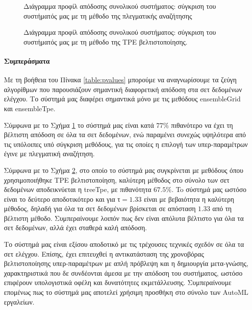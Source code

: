 \begin{figure}[!htb]
	\scalebox{0.8}{
	}
	\caption{Διάγραμμα προφίλ απόδοσης συνολικού συστήματος: σύγκριση του συστήματός μας με τη μέθοδο της πλεγματικής αναζήτησης}
	\label{fig:systemprofgrid}
\end{figure}


\begin{figure}[!htb]
	\scalebox{0.8}{
	}
	\caption{Διάγραμμα προφίλ απόδοσης συνολικού συστήματος: σύγκριση του συστήματός μας με τη μέθοδο της ΤPE βελτιστοποίησης.}
	\label{fig:systemproftpe}
\end{figure}
	
\paragraph{Συμπεράσματα}
Με τη βοήθεια του Πίνακα \ref{table:pvalues} μπορούμε να αναγνωρίσουμε τα ζεύγη αλγορίθμων που παρουσιάζουν σημαντική διαφορετική απόδοση στα σετ δεδομένων ελέγχου. Το σύστημά μας διαφέρει σημαντικά μόνο με τις μεθόδους ensembleGrid και ensembleTpe.

Σύμφωνα με το Σχήμα \ref{fig:systemprofgrid} το σύστημά μας είναι κατά $77\%$ πιθανότερο να έχει τη βέλτιστη απόδοση σε όλα τα σετ δεδομένων, ενώ παραμένει συνεχώς υψηλότερα από τις υπόλοιπες υπό σύγκριση μεθόδους, για τις οποίες η επιλογή των υπερ-παραμέτρων έγινε με πλεγματική αναζήτηση.


Σύμφωνα με το Σχήμα \ref{fig:systemproftpe}, στο οποίο το σύστημά μας συγκρίνεται με μεθόδους όπου χρησιμοποιήθηκε TPE βελτιστοποίηση, καλύτερη μέθοδος στο σύνολο των σετ δεδομένων αποδεικνύεται η treeTpe, με πιθανότητα $67.5 \%$. To σύστημά μας ωστόσο είναι το δεύτερο αποδοτικότερο και για τ$=1.33$ είναι με βεβαιότητα η καλύτερη μέθοδος, δηλαδή για όλα τα σετ δεδομένων βρίσκεται σε απόσταση $1.33$ από τη βέλτιστη μέθοδο. Συμπεραίνουμε λοιπόν πως δεν είναι απόλυτα βέλτιστο για όλα τα σετ δεδομένων, αλλά έχει σταθερά καλή απόδοση. 

Το σύστημά μας είναι εξίσου αποδοτικό με τις τρέχουσες τεχνικές σχεδόν σε όλα τα σετ ελέγχου. Επίσης, έχει επιτευχθεί η αντικατάσταση της χρονοβόρας βελτιστοποίησης υπερ-παραμέτρων με απλή πρόβλεψη και η δημιουργία μετα-γνώσης, χαρακτηριστικά που δε συνδέονται άμεσα με την απόδοση του συστήματος, ωστόσο επιφέρουν υπολογιστικά οφέλη και δυνατότητες εκμετάλλευσης. Συμπεραίνουμε επομένως πως το σύστημά μας αποτελεί χρήσιμη προσθήκη στο σύνολο των \gls{AutoML} εργαλείων. 